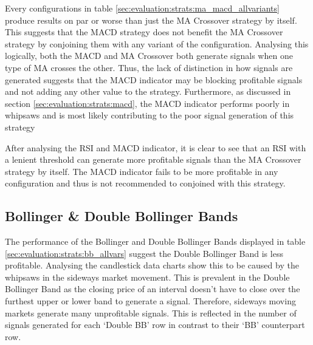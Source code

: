 Every configurations in table \ref{sec:evaluation:strats:ma_macd_allvariants} produce results on par or worse than just the MA Crossover strategy by itself. This suggests that the MACD strategy does not benefit the MA Crossover strategy by conjoining them with any variant of the configuration. Analysing this logically, both the MACD and MA Crossover both generate signals when one type of MA crosses the other. Thus, the lack of distinction in how signals are generated suggests that the MACD indicator may be blocking profitable signals and not adding any other value to the strategy. Furthermore, as discussed in section \ref{sec:evaluation:strats:macd}, the MACD indicator performs poorly in whipsaws and is most likely contributing to the poor signal generation of this strategy

After analysing the RSI and MACD indicator, it is clear to see that an RSI with a lenient threshold can generate more profitable signals than the MA Crossover strategy by itself. The MACD indicator fails to be more profitable in any configuration and thus is not recommended to conjoined with this strategy.

\subsection{Bollinger \& Double Bollinger Bands}
\label{sec:evaluation:strats:bb_double_bb}

\noindent The performance of the Bollinger and Double Bollinger Bands displayed in table \ref{sec:evaluation:strats:bb_allvars} suggest the Double Bollinger Band is less profitable. Analysing the candlestick data charts show this to be caused by the whipsaws in the sideways market movement. This is prevalent in the Double Bollinger Band as the closing price of an interval doesn't have to close over the furthest upper or lower band to generate a signal. Therefore, sideways moving markets generate many unprofitable signals. This is reflected in the number of signals generated for each `Double BB' row in contrast to their `BB' counterpart row.

